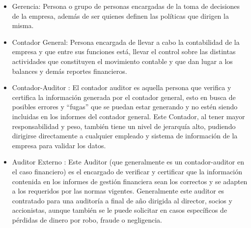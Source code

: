 {	
	\vspace{3mm}
	
	
	\vspace{3mm}
	
	\begin{itemize}
	\item Gerencia: Persona o grupo de personas encargadas de la toma de decisiones de la empresa, además de ser quienes definen las políticas que dirigen la misma.
	\item Contador General​: Persona encargada de llevar a cabo la contabilidad de la empresa y que entre sus funciones está, llevar el control sobre las distintas actividades que constituyen el movimiento contable y que dan lugar a los balances y demás reportes financieros.
	\item Contador-Auditor​ : El contador auditor es aquella persona que verifica y certifica la información generada por el contador general, esto en busca de posibles errores y “fugas” que se puedan estar generando y no estén siendo incluidas en los informes del contador general. Este Contador, al tener mayor responsabilidad y peso, también tiene un nivel de jerarquía alto, pudiendo dirigirse directamente a cualquier empleado y sistema de información de la empresa para validar los datos.
	\item Auditor Externo​ : Este Auditor (que generalmente es un contador-auditor en el caso financiero) es el encargado de verificar y certificar que la información contenida en los informes de gestión financiera sean los correctos y se adapten a los requeridos por las normas vigentes. Generalmente este auditor es contratado para una auditoría a final de año dirigida al director, socios y accionistas, aunque también se le puede solicitar en casos específicos de pérdidas de dinero por robo, fraude o negligencia. 
	\end{itemize}
	
}
